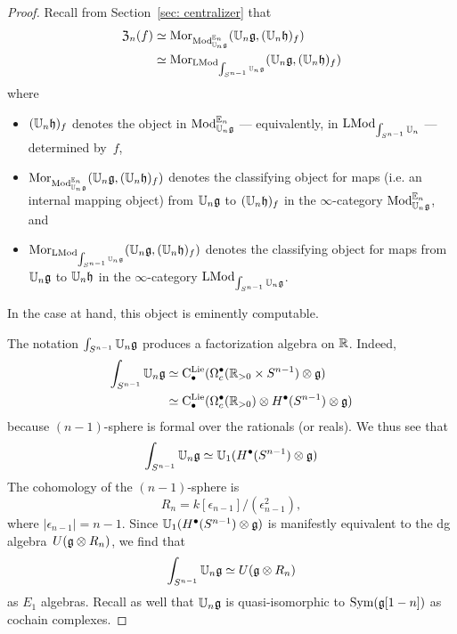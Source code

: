 \documentclass[11pt]{amsart}
\numberwithin{equation}{section}
\begin{document}
\begin{proof}
Recall from Section~\ref{sec: centralizer} that 
\begin{align*}
{\frak Z}_n(f) &\simeq {{\rm Mor}}_{{\rm Mod}^{\mathbb E_n}_{\mathbb U_n\mathfrak g}}(\mathbb U_n \mathfrak g, (\mathbb U_n \mathfrak h)_f) \\
&\simeq {\rm Mor}_{{\rm LMod}_{\int_{S^{n-1}} \mathbb U_n\mathfrak g}}(\mathbb U_n \mathfrak g, (\mathbb U_n \mathfrak h)_f)
\end{align*}
where 
\begin{itemize}
\item $(\mathbb U_n \mathfrak h)_f$ denotes the object in ${\rm Mod}^{\mathbb E_n}_{\mathbb U_n\mathfrak g}$ --- equivalently, in ${\rm LMod}_{\int_{S^{n-1}}\mathbb U_n}$ --- determined by~$f$, 
\item ${\rm Mor}_{{\rm Mod}^{\mathbb E_n}_{\mathbb U_n\mathfrak g}}(\mathbb U_n \mathfrak g, (\mathbb U_n \mathfrak h)_f)$ denotes the classifying object for maps (i.e. an internal mapping object) from $\mathbb U_n\mathfrak g$ to $(\mathbb U_n \mathfrak h)_f$ in the $\infty$-category ${\rm Mod}^{\mathbb E_n}_{\mathbb U_n\mathfrak g}$, and
\item ${\rm Mor}_{{\rm LMod}_{\int_{S^{n-1}} \mathbb U_n\mathfrak g}} (\mathbb U_n \mathfrak g, (\mathbb U_n \mathfrak h)_f)$ denotes the classifying object for maps from ${\mathbb U_n\mathfrak g}$ to $\mathbb U_n \mathfrak h$ in the $\infty$-category ${\rm LMod}_{\int_{S^{n-1}}\mathbb U_n\mathfrak g}$. 
\end{itemize}
In the case at hand, this object is eminently computable.

The notation $\int_{S^{n-1}}\mathbb U_n\mathfrak g$ produces a factorization algebra on $\mathbb R$.
Indeed,
\begin{align*}
\int_{S^{n-1}}\mathbb U_n\mathfrak g 
&\simeq {\rm C}^{\rm Lie}_\bullet(\Omega^\bullet_c(\mathbb R_{> 0} \times S^{n-1}) \otimes \mathfrak g)\\
&\simeq {\rm C}^{\rm Lie}_\bullet(\Omega^\bullet_c(\mathbb R_{> 0}) \otimes H^\bullet(S^{n-1}) \otimes \mathfrak g)
\end{align*}
because $(n-1)$-sphere is formal over the rationals (or reals). 
We thus see that 
\[
\int_{S^{n-1}}\mathbb U_n\mathfrak g \simeq \mathbb U_1 (H^\bullet(S^{n-1}) \otimes \mathfrak g)
\]
The cohomology of the $(n-1)$-sphere is 
\[
R_n = k[\epsilon_{n-1}]/(\epsilon_{n-1}^2),
\] 
where $|\epsilon_{n-1}| = n-1$.
Since $\mathbb U_1 (H^\bullet(S^{n-1}) \otimes \mathfrak g)$ is manifestly equivalent to the dg algebra~$U(\mathfrak g \otimes R_n)$,
we find that 
\[
\int_{S^{n-1}}\mathbb U_n\mathfrak g \simeq U(\mathfrak g \otimes R_n)
\]
as $E_1$ algebras.
Recall as well that $\mathbb U_n \mathfrak g$ is quasi-isomorphic to ${\rm Sym}(\mathfrak g[1-n])$ as cochain complexes.


\end{proof}
\end{document}

